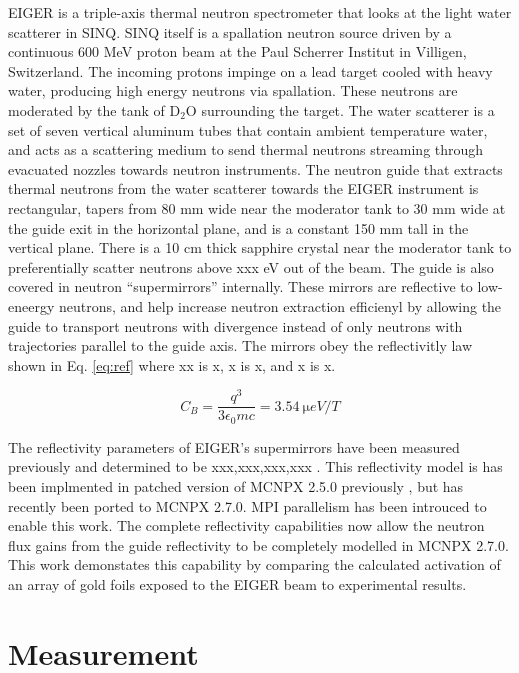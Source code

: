\documentclass[a4paper,
              ]{jacow}
\begin{document}
EIGER is a triple-axis thermal neutron spectrometer that looks at the light water scatterer in SINQ.  SINQ itself is a spallation neutron source driven by a continuous 600 MeV proton beam at the Paul Scherrer Institut in Villigen, Switzerland.  The incoming protons impinge on a lead target cooled with heavy water, producing high energy neutrons via spallation.  These neutrons are moderated by the tank of D$_2$O surrounding the target.  The water scatterer is a set of seven vertical aluminum tubes that contain ambient temperature water, and acts as a scattering medium to send thermal neutrons streaming through evacuated nozzles towards neutron instruments.  The neutron guide that extracts thermal neutrons from the water scatterer towards the EIGER instrument is rectangular, tapers from 80 mm wide near the moderator tank to 30 mm wide at the guide exit in the horizontal plane, and is a constant 150 mm tall in the vertical plane.  There is a 10 cm thick sapphire crystal near the moderator tank to preferentially scatter neutrons above xxx eV out of the beam.  The guide is also covered in neutron ``supermirrors'' internally.  These mirrors are reflective to low-eneergy neutrons, and help increase neutron extraction efficienyl by allowing the guide to transport neutrons with divergence instead of only neutrons with trajectories parallel to the guide axis.  The mirrors obey the reflectivitly law shown in Eq. \ref{eq:ref} where xx is x, x is x, and x is x.

\begin{equation}\label{eq:ref}
    C_B=\frac{q^3}{3\epsilon_{0} mc}=\SI{3.54}{\micro eV/T}
\end{equation}

The reflectivity parameters of EIGER's supermirrors have been measured previously and determined to be xxx,xxx,xxx,xxx \cite{eiger-uwe}.  This reflectivity model is has been implmented in patched version of MCNPX 2.5.0 previously \cite{mcnpx-ref}, but has recently been ported to MCNPX 2.7.0.  MPI parallelism has been introuced to enable this work.  The complete reflectivity capabilities now allow the neutron flux gains from the guide reflectivity to be completely modelled in MCNPX 2.7.0.  This work demonstates this capability by comparing the calculated activation of an array of gold foils exposed to the EIGER beam to experimental results.


\section{Measurement}
\end{document}
